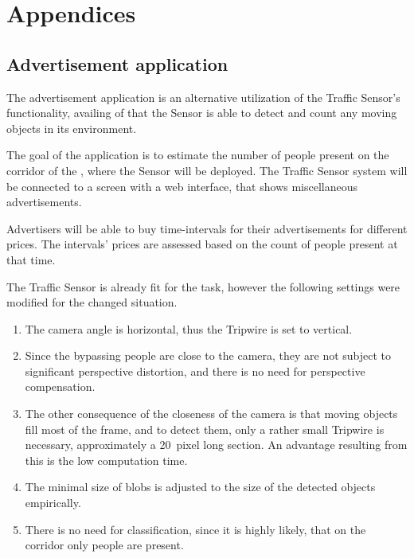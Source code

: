\appendix
\chapter*{Appendices}\label{chap:Appendices}
\setcounter{chapter}{1}  %
\setcounter{equation}{0} 

\section{Advertisement application}
The advertisement application is an alternative utilization of the Traffic Sensor's functionality, availing of that the Sensor is able to detect and count any moving objects in its environment.

The goal of the application is to estimate the number of people present on the corridor of the \viktanszek, where the Sensor will be deployed.
The Traffic Sensor system will be connected to a screen with a web interface, that shows miscellaneous advertisements.

Advertisers will be able to buy time-intervals for their advertisements for different prices.
The intervals' prices are assessed based on the count of people present at that time.

The Traffic Sensor is already fit for the task, however the following settings were modified for the changed situation.
\begin{enumerate}
	\item The camera angle is horizontal, thus the Tripwire is set to vertical.
	
	\item Since the bypassing people are close to the camera, they are not subject to significant  perspective distortion, and there is no need for perspective compensation.
	
	\item The other consequence of the closeness of the camera is that moving objects fill most of the frame, and to detect them, only a rather small Tripwire is necessary, approximately a \SI{20}{pixel} long section.
	An advantage resulting from this is the low computation time.
	
	\item The minimal size of blobs is adjusted to the size of the detected objects empirically.
	
	\item There is no need for classification, since it is highly likely, that on the corridor only people are present.
\end{enumerate}

